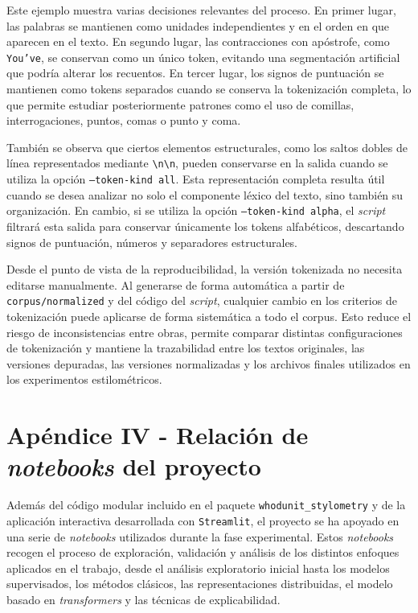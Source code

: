 \documentclass[IB]{TFUOC}%
\begin{document}
Este ejemplo muestra varias decisiones relevantes del proceso. En primer lugar, las palabras se mantienen como unidades independientes y en el orden en que aparecen en el texto. En segundo lugar, las contracciones con apóstrofe, como \texttt{You've}, se conservan como un único token, evitando una segmentación artificial que podría alterar los recuentos. En tercer lugar, los signos de puntuación se mantienen como tokens separados cuando se conserva la tokenización completa, lo que permite estudiar posteriormente patrones como el uso de comillas, interrogaciones, puntos, comas o punto y coma.

También se observa que ciertos elementos estructurales, como los saltos dobles de línea representados mediante \texttt{\textbackslash n\textbackslash n}, pueden conservarse en la salida cuando se utiliza la opción \texttt{--token-kind all}. Esta representación completa resulta útil cuando se desea analizar no solo el componente léxico del texto, sino también su organización. En cambio, si se utiliza la opción \texttt{--token-kind alpha}, el \textit{script} filtrará esta salida para conservar únicamente los tokens alfabéticos, descartando signos de puntuación, números y separadores estructurales.

Desde el punto de vista de la reproducibilidad, la versión tokenizada no necesita editarse manualmente. Al generarse de forma automática a partir de \texttt{corpus/normalized} y del código del \textit{script}, cualquier cambio en los criterios de tokenización puede aplicarse de forma sistemática a todo el corpus. Esto reduce el riesgo de inconsistencias entre obras, permite comparar distintas configuraciones de tokenización y mantiene la trazabilidad entre los textos originales, las versiones depuradas, las versiones normalizadas y los archivos finales utilizados en los experimentos estilométricos.

\section*{Apéndice IV - Relación de \textit{notebooks} del proyecto}
\label{apx:notebooks}

Además del código modular incluido en el paquete \texttt{whodunit\_stylometry} y de la aplicación interactiva desarrollada con \texttt{Streamlit}, el proyecto se ha apoyado en una serie de \textit{notebooks} utilizados durante la fase experimental. Estos \textit{notebooks} recogen el proceso de exploración, validación y análisis de los distintos enfoques aplicados en el trabajo, desde el análisis exploratorio inicial hasta los modelos supervisados, los métodos clásicos, las representaciones distribuidas, el modelo basado en \textit{transformers} y las técnicas de explicabilidad.
\end{document}
